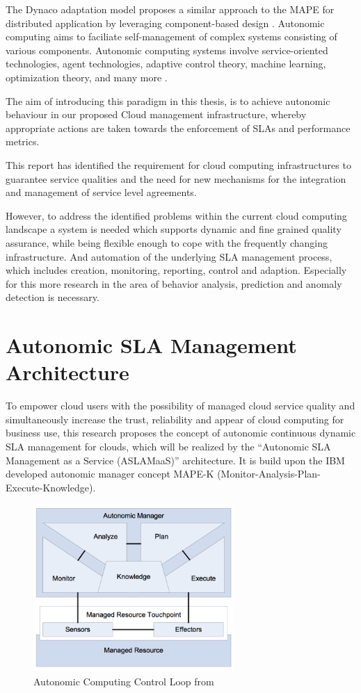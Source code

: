 The Dynaco adaptation model proposes a similar approach to the MAPE for distributed application by leveraging component-based design \citep{buisson2005dynamic} \citep{buisson2006adaptation}. Autonomic computing aims to faciliate self-management of complex systems consisting of various components. Autonomic computing systems involve service-oriented technologies, agent technologies, adaptive control theory, machine learning, optimization theory, and many more \citep{fei2005design} \citep{zhao2009survey}. 
 
The aim of introducing this paradigm in this thesis, is to achieve autonomic behaviour in our proposed Cloud management infrastructure, whereby appropriate actions are taken towards the enforcement of SLAs and performance metrics.

This report has identified the requirement for cloud computing infrastructures to guarantee service qualities and the need for new mechanisms for the integration and management of service level agreements. 


However, to address the identified problems within the current cloud computing landscape a system is needed which supports dynamic and fine grained quality assurance, while being flexible enough to cope with the frequently changing infrastructure. And automation of the underlying SLA management process, which includes creation,  monitoring, reporting, control and adaption. Especially for this more research in the area of behavior analysis, prediction and anomaly detection is necessary.

\section{Autonomic SLA Management Architecture}
To empower cloud users with the possibility of  managed cloud service quality and simultaneously increase the trust, reliability and appear of cloud computing for business use, this research proposes the concept of autonomic continuous dynamic SLA management for clouds, which will be realized by the “Autonomic SLA Management as a Service (ASLAMaaS)” architecture. It is build upon the IBM developed autonomic manager concept MAPE-K \cite{MAPE-K} (Monitor-Analysis-Plan-Execute-Knowledge).

\begin{figure}[!ht]
\centering
\includegraphics[width=3in]{chapters/chapter4/fig/MAPE.PNG}
\caption{Autonomic Computing Control Loop from \cite{MAPE-K}}
\label{fig_MAPE}
\end{figure}

